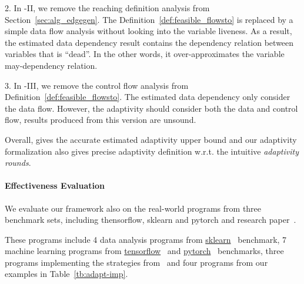 2. In {\THESYSTEM}-II, we remove the reaching definition analysis from Section~\ref{sec:alg_edgegen}.
The Definition~\ref{def:feasible_flowsto} is replaced by a simple data flow analysis without looking into the variable liveness.
As a result, the estimated data dependency result contains the dependency relation between variables that is ``dead''. In the other words, it over-approximates the variable may-dependency relation.

3. In {\THESYSTEM}-III, we remove the control flow analysis from Definition~\ref{def:feasible_flowsto}.
The estimated data dependency only consider the data flow.
However, the adaptivity should consider both the data and control flow, results produced from this version are unsound.

Overall, {\THESYSTEM} gives the accurate estimated
adaptivity upper bound and our adaptivity formalization also gives precise adaptivity definition w.r.t. the intuitive \emph{adaptivity rounds}.


\paragraph{Effectiveness Evaluation}

We evaluate our framework also on the real-world programs from
three benchmark sets, including thensorflow, sklearn and pytorch and research paper~\cite{Jamieson2015TheAO}.

These programs include  
4 data analysis programs 
from \hyperlink{https://github.com/scikit-learn/scikit-learn/tree/main/examples}{sklearn}~\cite{SklearnBenchmark} benchmark,
7 machine learning programs
from \hyperlink{https://github.com/tensorflow/tensorflow/tree/master/tensorflow/examples}{tensorflow}~\cite{TensorflowBenchmark}
and \hyperlink{https://github.com/pytorch/pytorch}{pytorch}~\cite{PytorchBenchmark}
benchmarks,
{three programs implementing the strategies from~\cite{Jamieson2015TheAO}}
and four programs from our examples in Table~\ref{tb:adapt-imp}.


